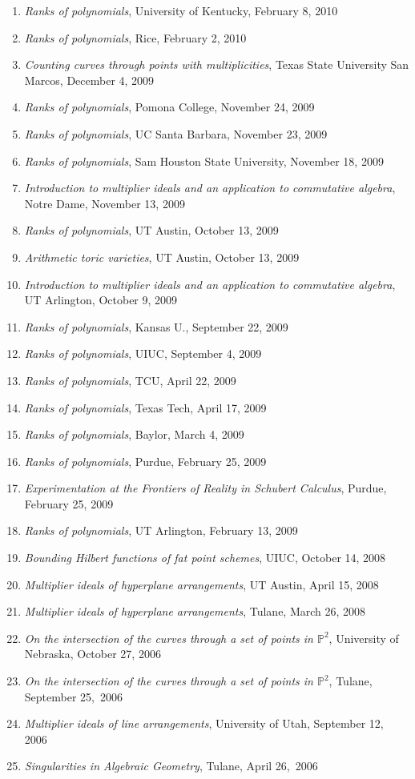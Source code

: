 \documentclass[12pt]{article}
\begin{document}
\begin{enumerate}
\item \textit{Ranks of polynomials},
University of Kentucky, February 8, 2010
\item \textit{Ranks of polynomials},
Rice, February 2, 2010
\item \textit{Counting curves through points with multiplicities},
Texas State University San Marcos, December 4, 2009
\item \textit{Ranks of polynomials},
Pomona College, November 24, 2009
\item \textit{Ranks of polynomials},
UC Santa Barbara, November 23, 2009
\item \textit{Ranks of polynomials},
Sam Houston State University, November 18, 2009
\item \textit{Introduction to multiplier ideals and an application to commutative algebra},
Notre Dame, November 13, 2009
\item \textit{Ranks of polynomials},
UT Austin, October 13, 2009
\item \textit{Arithmetic toric varieties},
UT Austin, October 13, 2009
\item \textit{Introduction to multiplier ideals and an application to commutative algebra},
UT Arlington, October 9, 2009
\item \textit{Ranks of polynomials},
Kansas U., September 22, 2009
\item \textit{Ranks of polynomials},
UIUC, September 4, 2009
\item \textit{Ranks of polynomials},
TCU, April 22, 2009
\item \textit{Ranks of polynomials},
Texas Tech, April 17, 2009
\item \textit{Ranks of polynomials},
Baylor, March 4, 2009
\item \textit{Ranks of polynomials},
Purdue, February 25, 2009
\item \textit{Experimentation at the Frontiers of Reality in Schubert Calculus},
Purdue, February 25, 2009
\item \textit{Ranks of polynomials},
UT Arlington, February 13, 2009
\item \textit{Bounding Hilbert functions of fat point schemes},
UIUC, October 14, 2008
\item \textit{Multiplier ideals of hyperplane arrangements},
UT Austin, April 15, 2008
\item \textit{Multiplier ideals of hyperplane arrangements},
Tulane, March 26, 2008
\item \textit{On the intersection of the curves through a set of points in $\mathbb{P}^2$},
University of Nebraska, October 27, 2006
\item \textit{On the intersection of the curves through a set of points in $\mathbb{P}^2$},
Tulane, September 25,~2006
\item \textit{Multiplier ideals of line arrangements}, University of Utah, September 12, 2006
\item \textit{Singularities in Algebraic Geometry}, Tulane, April 26,~2006
\end{enumerate}
\end{document}
